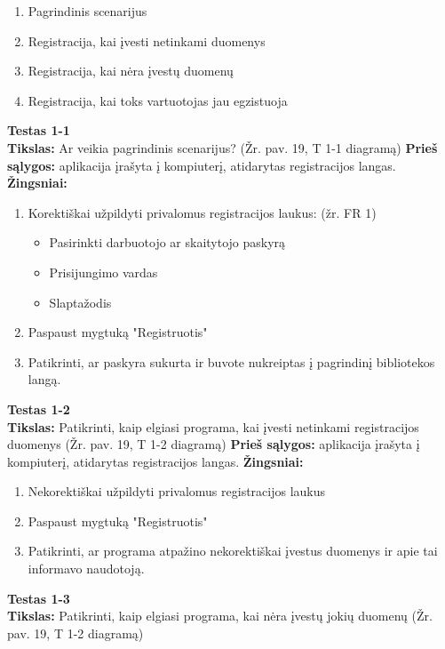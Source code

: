 \documentclass{VUMIFPSkursinis}
\begin{document}
\begin{enumerate}
\item Pagrindinis scenarijus
\item Registracija, kai įvesti netinkami duomenys
\item Registracija, kai nėra įvestų duomenų
\item Registracija, kai toks vartuotojas jau egzistuoja
\end{enumerate}
\hfill \break
\textbf{Testas 1-1}\\
\hfill \break
\textbf{Tikslas:} Ar veikia pagrindinis scenarijus? (Žr. pav. 19, T 1-1 diagramą)
\hfill \break
\hfill \break
\textbf{Prieš sąlygos:} aplikacija įrašyta į kompiuterį, atidarytas registracijos langas.
\hfill \break
\hfill \break
\textbf{Žingsniai:}
\hfill \break
\begin{enumerate}
\item Korektiškai užpildyti privalomus registracijos laukus: (žr. FR 1)
\begin{itemize}
\item Pasirinkti darbuotojo ar skaitytojo paskyrą
\item Prisijungimo vardas
\item Slaptažodis
\end{itemize}
\item Paspaust mygtuką "Registruotis"
\item Patikrinti, ar paskyra sukurta ir buvote nukreiptas į pagrindinį bibliotekos langą.
\end{enumerate}
\textbf{Testas 1-2}\\
\hfill \break
\textbf{Tikslas:} Patikrinti, kaip elgiasi programa, kai įvesti netinkami registracijos duomenys (Žr. pav. 19, T 1-2 diagramą)
\hfill \break
\hfill \break
\textbf{Prieš sąlygos:} aplikacija įrašyta į kompiuterį, atidarytas registracijos langas.
\hfill \break
\hfill \break
\textbf{Žingsniai:}
\hfill \break
\begin{enumerate}
\item Nekorektiškai užpildyti privalomus registracijos laukus
\item Paspaust mygtuką "Registruotis"
\item Patikrinti, ar programa atpažino nekorektiškai įvestus duomenys ir apie tai informavo naudotoją.
\end{enumerate}
\textbf{Testas 1-3}\\
\hfill \break
\textbf{Tikslas:} Patikrinti, kaip elgiasi programa, kai nėra įvestų jokių duomenų (Žr. pav. 19, T 1-2 diagramą)
\hfill \break
\hfill \break
\end{document}
